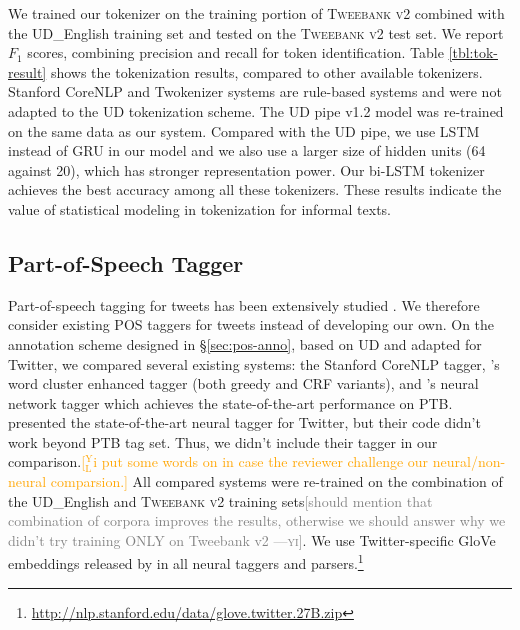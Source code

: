 \documentclass[11pt,a4paper]{article}
\newcommand{\yjcomment}[1]{\textcolor{orange}{[$_\mathrm{L}^\mathrm{Y}$#1]}}
\newcommand{\yicomment}[1]{\textcolor{gray}{[#1 ---\textsc{yi}]}}
\begin{document}
We trained our tokenizer on the training portion of
\textsc{Tweebank v2} combined with the UD\_English training set
and tested on the \textsc{Tweebank v2} test set. 
We report $F_1$ scores, combining precision and recall for token identification. Table \ref{tbl:tok-result} shows the
tokenization results, compared to  other available tokenizers. 
 Stanford CoreNLP \cite{manning-EtAl:2014:P14-5} and Twokenizer
\cite{ICWSM101540} systems are rule-based systems and were not adapted
to the UD tokenization scheme.
The UD pipe v1.2
\cite{straka-strakova:2017:K17-3} model was re-trained on the same
data as our system. Compared with the UD pipe, we use LSTM
instead of GRU in our model and we also use a larger size of hidden units (64 against 20),
which has stronger representation power. 
Our bi-LSTM tokenizer achieves the best accuracy among all these
tokenizers.  These results indicate the value of statistical modeling
in tokenization for informal texts.

\subsection{Part-of-Speech Tagger}


Part-of-speech tagging for tweets has been extensively studied \cite{ritter-EtAl:2011:EMNLP,gimpel-EtAl:2011:ACL-HLT2011,derczynski-EtAl:2013:RANLP-2013,owoputi-EtAl:2013:NAACL-HLT,gui-EtAl:2017:EMNLP20172}. We therefore consider existing POS taggers for tweets instead of developing our own.
On the annotation scheme designed in \S\ref{sec:pos-anno}, based on UD and adapted for
Twitter, we compared several existing systems: the Stanford CoreNLP tagger, 
\citet{owoputi-EtAl:2013:NAACL-HLT}'s word cluster enhanced tagger
(both greedy and CRF variants), and 
\citet{ma-hovy:2016:P16-1}'s neural network tagger 
which achieves the state-of-the-art performance on PTB.
\citet{gui-EtAl:2017:EMNLP20172} presented the state-of-the-art neural tagger for Twitter,
but their code didn't work beyond PTB tag set. Thus, we didn't include their tagger in our comparison.\yjcomment{i put some words on \cite{gui-EtAl:2017:EMNLP20172} in case the reviewer challenge our neural/non-neural comparsion.}
All compared systems were re-trained on the combination of the UD\_English and 
\textsc{Tweebank v2} training sets\yicomment{should mention that combination of corpora improves the results, otherwise we should answer why we didn't try training ONLY on Tweebank v2}. We use Twitter-specific GloVe embeddings released by
\citet{pennington-socher-manning:2014:EMNLP2014} in all neural taggers
and parsers.\footnote{\url{http://nlp.stanford.edu/data/glove.twitter.27B.zip}}
\end{document}

